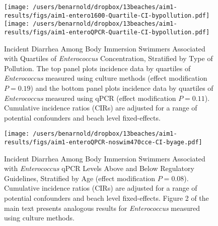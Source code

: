 \documentclass[12pt]{article}\usepackage[]{graphicx}\usepackage[]{color}
\begin{document}
\begin{figure}
\begin{center}
\texttt{[image: /users/benarnold/dropbox/13beaches/aim1-results/figs/aim1-entero1600-Quartile-CI-bypollution.pdf]} \\
\texttt{[image: /users/benarnold/dropbox/13beaches/aim1-results/figs/aim1-enteroQPCR-Quartile-CI-bypollution.pdf]}
\caption{Incident Diarrhea Among Body Immersion Swimmers Associated with Quartiles of \textit{Enterococcus} Concentration, Stratified by Type of Pollution. The top panel plots incidence data by quartiles of \textit{Enterococcus} measured using culture methods (effect modification $P=0.19$) and the bottom panel plots incidence data by quartiles of \textit{Enterococcus} measured using qPCR (effect modification $P=0.11$).  Cumulative incidence ratios (CIRs) are adjusted for a range of potential confounders and beach level fixed-effects.   \label{fig:Qenteropol}}
\end{center}
\end{figure}

\begin{figure}
\begin{center}
\texttt{[image: /users/benarnold/dropbox/13beaches/aim1-results/figs/aim1-enteroQPCR-noswim470cce-CI-byage.pdf]} \\
\caption{Incident Diarrhea Among Body Immersion Swimmers Associated with \textit{Enterococcus} qPCR Levels Above and Below Regulatory Guidelines, Stratified by Age (effect modification $P=0.08$). Cumulative incidence ratios (CIRs) are adjusted for a range of potential confounders and beach level fixed-effects. Figure 2 of the main text presents analogous results for \textit{Enterococcus} measured using culture methods. \label{fig:enteroQCPRage}}
\end{center}
\end{figure}
\end{document}

